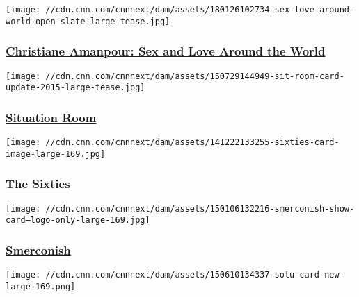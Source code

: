\href{/shows/sex-and-love-around-the-world}{}

\texttt{[image: //cdn.cnn.com/cnnnext/dam/assets/180126102734-sex-love-around-world-open-slate-large-tease.jpg]}

\hypertarget{christiane-amanpour-sex-and-love-around-the-world}{%
\subsubsection{\texorpdfstring{\href{/shows/sex-and-love-around-the-world}{Christiane
Amanpour: Sex and Love Around the
World}}{Christiane Amanpour: Sex and Love Around the World}}\label{christiane-amanpour-sex-and-love-around-the-world}}

\href{/shows/situation-room}{}

\texttt{[image: //cdn.cnn.com/cnnnext/dam/assets/150729144949-sit-room-card-update-2015-large-tease.jpg]}

\hypertarget{situation-room}{%
\subsubsection{\texorpdfstring{\href{/shows/situation-room}{Situation
Room}}{Situation Room}}\label{situation-room}}

\href{/shows/the-sixties}{}

\texttt{[image: //cdn.cnn.com/cnnnext/dam/assets/141222133255-sixties-card-image-large-169.jpg]}

\hypertarget{the-sixties}{%
\subsubsection{\texorpdfstring{\href{/shows/the-sixties}{The
Sixties}}{The Sixties}}\label{the-sixties}}

\href{/shows/smerconish}{}

\texttt{[image: //cdn.cnn.com/cnnnext/dam/assets/150106132216-smerconish-show-card---logo-only-large-169.jpg]}

\hypertarget{smerconish}{%
\subsubsection{\texorpdfstring{\href{/shows/smerconish}{Smerconish}}{Smerconish}}\label{smerconish}}

\href{/shows/state-of-the-union}{}

\texttt{[image: //cdn.cnn.com/cnnnext/dam/assets/150610134337-sotu-card-new-large-169.png]}

